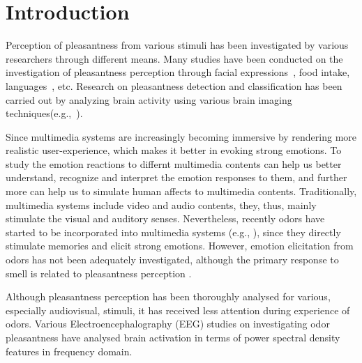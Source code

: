 \section{Introduction}


Perception of pleasantness from various stimuli has been investigated by various researchers through different means. Many studies have been conducted on the investigation of pleasantness perception through facial expressions~\cite{lyons1998coding}, food intake\cite{de2003taste}, languages~\cite{bellezza1986words}, etc. Research on pleasantness detection and classification has been carried out by analyzing brain activity using various brain imaging techniques(e.g.,~\cite{zatorre2000neural,kringelbach2003activation,kroupi2014eeg}).


Since multimedia systems are increasingly becoming immersive by rendering more realistic user-experience, which makes it better in evoking strong emotions. To study the emotion reactions to differnt multimedia contents can help us better understand, recognize and interpret the emotion responses to them, and further more can help us to simulate human affects to multimedia contents. Traditionally, multimedia systems include video and audio contents, they, thus, mainly stimulate the visual and auditory senses. Nevertheless, recently odors have started to be incorporated into multimedia systems (e.g., \cite{nakamoto2011olfactory,nakamoto2008cooking,richard2006multi}), since they directly stimulate memories and elicit strong emotions. However, emotion elicitation from odors has not been adequately investigated, although the primary response to smell is related to pleasantness perception \cite{gulas1995right}. 


Although pleasantness perception has been thoroughly analysed for various, especially audiovisual, stimuli, it has received less attention during experience of odors. Various Electroencephalography (EEG) studies on investigating odor pleasantness have analysed brain activation in terms of power spectral density features in frequency domain. 

